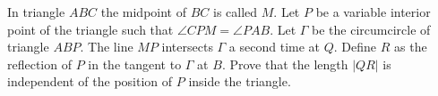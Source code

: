 In triangle $ABC$ the midpoint of $BC$ is called $M$. Let $P$ be a variable interior point of the triangle such that $\angle CPM=\angle PAB$. Let $\Gamma$ be the circumcircle of triangle $ABP$. The line $MP$ intersects $\Gamma$ a second time at $Q$. Define $R$ as the reflection of $P$ in the tangent to $\Gamma$ at $B$. Prove that the length $|QR|$ is independent of the position of $P$ inside the triangle.